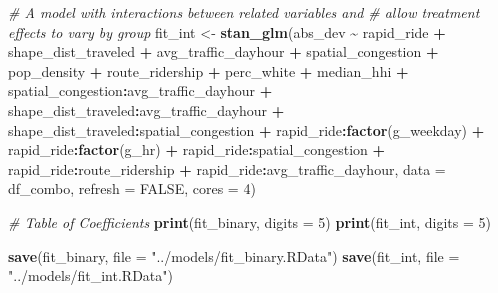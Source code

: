\documentclass[
  12pt,
]{article}
\newenvironment{Shaded}{\begin{snugshade}}{\end{snugshade}}
\newcommand{\AttributeTok}[1]{\textcolor[rgb]{0.13,0.29,0.53}{#1}}
\newcommand{\CommentTok}[1]{\textcolor[rgb]{0.56,0.35,0.01}{\textit{#1}}}
\newcommand{\ConstantTok}[1]{\textcolor[rgb]{0.56,0.35,0.01}{#1}}
\newcommand{\DecValTok}[1]{\textcolor[rgb]{0.00,0.00,0.81}{#1}}
\newcommand{\FunctionTok}[1]{\textcolor[rgb]{0.13,0.29,0.53}{\textbf{#1}}}
\newcommand{\NormalTok}[1]{#1}
\newcommand{\OtherTok}[1]{\textcolor[rgb]{0.56,0.35,0.01}{#1}}
\newcommand{\SpecialCharTok}[1]{\textcolor[rgb]{0.81,0.36,0.00}{\textbf{#1}}}
\newcommand{\StringTok}[1]{\textcolor[rgb]{0.31,0.60,0.02}{#1}}
\begin{document}
\begin{Shaded}
\begin{Highlighting}[]
\CommentTok{\# A model with interactions between related variables and }
\CommentTok{\# allow treatment effects to vary by group}
\NormalTok{fit\_int }\OtherTok{\textless{}{-}} \FunctionTok{stan\_glm}\NormalTok{(abs\_dev }\SpecialCharTok{\textasciitilde{}}\NormalTok{ rapid\_ride }\SpecialCharTok{+} 
\NormalTok{                         shape\_dist\_traveled }\SpecialCharTok{+} 
\NormalTok{                         avg\_traffic\_dayhour }\SpecialCharTok{+} 
\NormalTok{                         spatial\_congestion }\SpecialCharTok{+}
\NormalTok{                         pop\_density }\SpecialCharTok{+} 
\NormalTok{                         route\_ridership }\SpecialCharTok{+} 
\NormalTok{                         perc\_white }\SpecialCharTok{+} 
\NormalTok{                         median\_hhi }\SpecialCharTok{+}
\NormalTok{                         spatial\_congestion}\SpecialCharTok{:}\NormalTok{avg\_traffic\_dayhour }\SpecialCharTok{+} 
\NormalTok{                         shape\_dist\_traveled}\SpecialCharTok{:}\NormalTok{avg\_traffic\_dayhour }\SpecialCharTok{+} 
\NormalTok{                         shape\_dist\_traveled}\SpecialCharTok{:}\NormalTok{spatial\_congestion }\SpecialCharTok{+} 
\NormalTok{                         rapid\_ride}\SpecialCharTok{:}\FunctionTok{factor}\NormalTok{(g\_weekday) }\SpecialCharTok{+}
\NormalTok{                         rapid\_ride}\SpecialCharTok{:}\FunctionTok{factor}\NormalTok{(g\_hr) }\SpecialCharTok{+} 
\NormalTok{                         rapid\_ride}\SpecialCharTok{:}\NormalTok{spatial\_congestion }\SpecialCharTok{+} 
\NormalTok{                         rapid\_ride}\SpecialCharTok{:}\NormalTok{route\_ridership }\SpecialCharTok{+} 
\NormalTok{                         rapid\_ride}\SpecialCharTok{:}\NormalTok{avg\_traffic\_dayhour,}
                       \AttributeTok{data =}\NormalTok{ df\_combo,}
                       \AttributeTok{refresh =} \ConstantTok{FALSE}\NormalTok{,}
                       \AttributeTok{cores =} \DecValTok{4}\NormalTok{)}

\CommentTok{\# Table of Coefficients}
\FunctionTok{print}\NormalTok{(fit\_binary, }\AttributeTok{digits =} \DecValTok{5}\NormalTok{)}
\FunctionTok{print}\NormalTok{(fit\_int, }\AttributeTok{digits =} \DecValTok{5}\NormalTok{)}

\FunctionTok{save}\NormalTok{(fit\_binary, }\AttributeTok{file =} \StringTok{"../models/fit\_binary.RData"}\NormalTok{)}
\FunctionTok{save}\NormalTok{(fit\_int, }\AttributeTok{file =} \StringTok{"../models/fit\_int.RData"}\NormalTok{)}
\end{Highlighting}
\end{Shaded}
\end{document}
